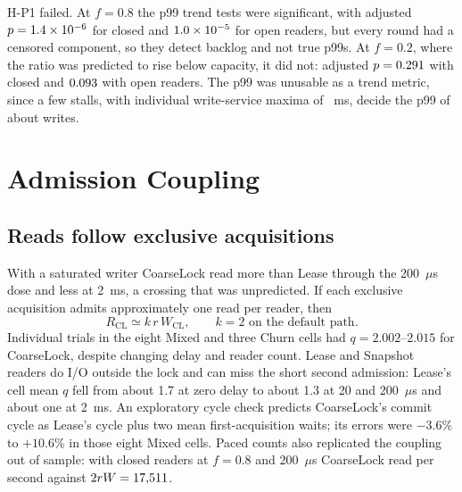 \documentclass[conference]{IEEEtran}
\begin{document}
H-P1 failed. At $f=0.8$ the p99 trend tests were significant, with adjusted $p=1.4\times10^{-6}$ for closed and $1.0\times10^{-5}$ for open readers, but every round had a censored component, so they detect backlog and not true p99s. At $f=0.2$, where the ratio was predicted to rise below capacity, it did not: adjusted $p=0.291$ with closed and $0.093$ with open readers. The p99 was unusable as a trend metric, since a few stalls, with individual write-service maxima of \PacedStallRange{}~ms, decide the p99 of about \PacedLowWriteCount{} writes.

\section{Admission Coupling}
\label{sec:admission}
\subsection{Reads follow exclusive acquisitions}
With a saturated writer CoarseLock read more than Lease through the 200~$\mu$s dose and less at 2~ms, a crossing that was unpredicted. If each exclusive acquisition admits approximately one read per reader, then
\begin{equation}
R_{\mathrm{CL}}\simeq k\,r\,W_{\mathrm{CL}},\qquad k=2\text{ on the default path}.
\label{eq:coupling}
\end{equation}
Individual trials in the eight Mixed and three Churn cells had $q=2.002$--$2.015$ for CoarseLock, despite changing delay and reader count. Lease and Snapshot readers do I/O outside the lock and can miss the short second admission: Lease's cell mean $q$ fell from about 1.7 at zero delay to about 1.3 at 20 and 200~$\mu$s and about one at 2~ms. An exploratory cycle check predicts CoarseLock's commit cycle as Lease's cycle plus two mean first-acquisition waits; its errors were $-3.6\%$ to $+10.6\%$ in those eight Mixed cells. Paced counts also replicated the coupling out of sample: with closed readers at $f=0.8$ and 200~$\mu$s CoarseLock read \PacedReadsMedium{} per second against $2rW=17{,}511$.
\end{document}
